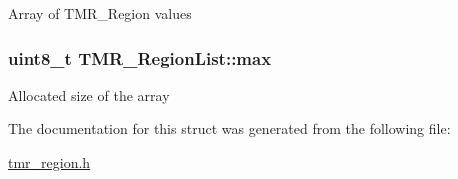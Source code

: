 Array of TMR\_\-Region values \hypertarget{struct_t_m_r___region_list_4d09327b5a3395f171579d3d4f775cb8}{
\subsubsection[{max}]{\setlength{\rightskip}{0pt plus 5cm}uint8\_\-t {\bf TMR\_\-RegionList::max}}}
\label{struct_t_m_r___region_list_4d09327b5a3395f171579d3d4f775cb8}


Allocated size of the array 

The documentation for this struct was generated from the following file:\begin{CompactItemize}
\item 
\hyperlink{tmr__region_8h}{tmr\_\-region.h}\end{CompactItemize}
